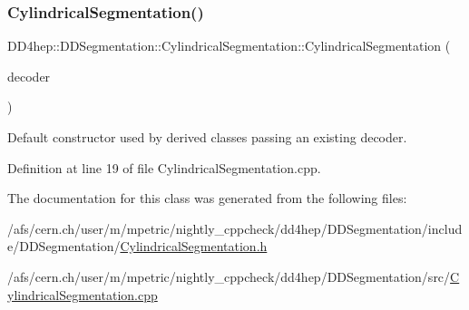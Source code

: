 \subsubsection{\texorpdfstring{Cylindrical\+Segmentation()}{CylindricalSegmentation()}\hspace{0.1cm}{\footnotesize\ttfamily [2/2]}}
{\footnotesize\ttfamily D\+D4hep\+::\+D\+D\+Segmentation\+::\+Cylindrical\+Segmentation\+::\+Cylindrical\+Segmentation (\begin{DoxyParamCaption}\item[{\hyperlink{class_d_d4hep_1_1_d_d_segmentation_1_1_bit_field64}{Bit\+Field64} $\ast$}]{decoder }\end{DoxyParamCaption})\hspace{0.3cm}{\ttfamily [protected]}}



Default constructor used by derived classes passing an existing decoder. 



Definition at line 19 of file Cylindrical\+Segmentation.\+cpp.



The documentation for this class was generated from the following files\+:\begin{DoxyCompactItemize}
\item 
/afs/cern.\+ch/user/m/mpetric/nightly\+\_\+cppcheck/dd4hep/\+D\+D\+Segmentation/include/\+D\+D\+Segmentation/\hyperlink{_cylindrical_segmentation_8h}{Cylindrical\+Segmentation.\+h}\item 
/afs/cern.\+ch/user/m/mpetric/nightly\+\_\+cppcheck/dd4hep/\+D\+D\+Segmentation/src/\hyperlink{_cylindrical_segmentation_8cpp}{Cylindrical\+Segmentation.\+cpp}\end{DoxyCompactItemize}
